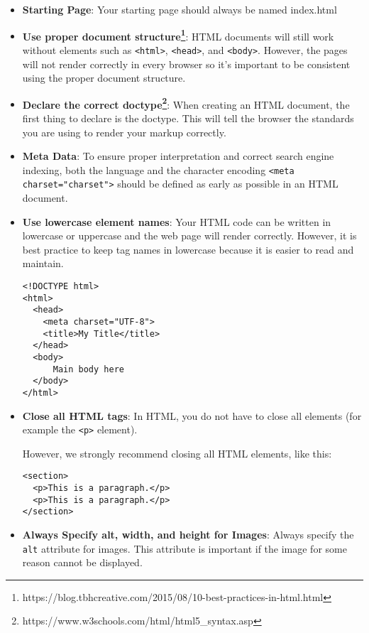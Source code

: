 \documentclass[11pt,a4paper]{report}
\newcommand{\bfb}[1]{{\bf \color{blue} #1}}
\begin{document}
\begin{itemize}
\item \bfb{Starting Page}: Your starting page should always be named index.html
\item \bfb{Use proper document structure\footnote{https://blog.tbhcreative.com/2015/08/10-best-practices-in-html.html}}: HTML documents will still work without elements such as \verb|<html>|, \verb|<head>|, and \verb|<body>|. However, the pages will not render correctly in every browser so it's important to be consistent using the proper document structure. 

\item \bfb{Declare the correct doctype\footnote{https://www.w3schools.com/html/html5\_syntax.asp}}: When creating an HTML document, the first thing to declare is the doctype. This will tell the browser the standards you are using to render your markup correctly. 

\item \bfb{Meta Data}: To ensure proper interpretation and correct search engine indexing, both the language and the character encoding \verb|<meta charset="charset">| should be defined as early as possible in an HTML document.

\item \bfb{Use lowercase element names}: Your HTML code can be written in lowercase or uppercase and the web page will render correctly. However, it is best practice to keep tag names in lowercase because it is easier to read and maintain.

\begin{lstlisting}[style=htmlcssjs]
<!DOCTYPE html>
<html>
  <head>
    <meta charset="UTF-8">
    <title>My Title</title>
  </head>
  <body>
      Main body here
  </body>
</html>
\end{lstlisting}

\item \bfb{Close all HTML tags}: In HTML, you do not have to close all elements (for example the \verb|<p>| element).

However, we strongly recommend closing all HTML elements, like this:
\begin{lstlisting}[style=htmlcssjs]
<section>
  <p>This is a paragraph.</p>
  <p>This is a paragraph.</p>
</section>
\end{lstlisting}



\item \bfb{Always Specify alt, width, and height for Images}: Always specify the \verb|alt| attribute for images. This attribute is important if the image for some reason cannot be displayed.


\end{itemize}
\end{document}
